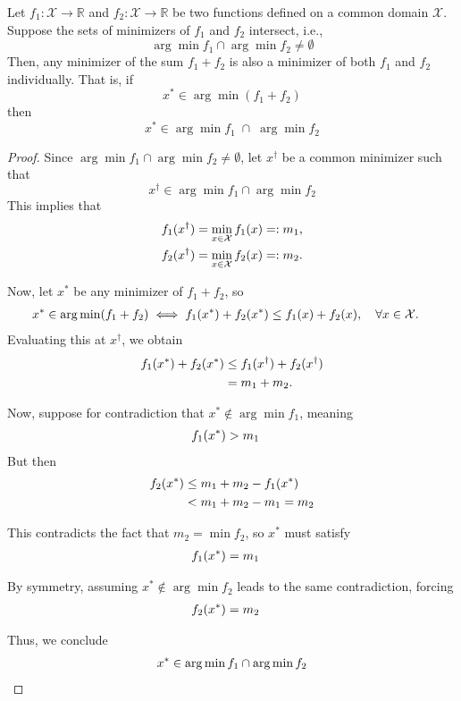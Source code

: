 \begin{lem}\label{lem:sharingsol}
    Let $f_1: \mathcal{X} \rightarrow \mathbb{R}$ and $f_2: \mathcal{X} \rightarrow \mathbb{R}$ be two functions defined on a common domain $\mathcal{X}$. Suppose the sets of minimizers of $f_1$ and $f_2$ intersect, i.e.,
$$
\arg \min f_1 \cap \arg \min f_2 \neq \emptyset
$$
Then, any minimizer of the sum $f_1+f_2$ is also a minimizer of both $f_1$ and $f_2$ individually. That is, if
$$
x^* \in \arg \min \left(f_1+f_2\right)
$$
then
$$
x^* \in \arg \min f_1 \; \cap \; \arg \min f_2
$$
\end{lem}
\begin{proof}
    Since \( \arg\min f_1 \cap \arg\min f_2 \neq \emptyset \), let \( x^\dagger \) be a common minimizer such that $$
x^\dagger \in \arg\min f_1 \cap \arg\min f_2$$
This implies that  
\begin{align}
    f_1(x^\dagger) &= \min_{x \in \mathcal{X}} f_1(x) =: m_1, \notag
    \\
    f_2(x^\dagger) &= \min_{x \in \mathcal{X}} f_2(x) =: m_2. \notag
\end{align}

Now, let \( x^* \) be any minimizer of \( f_1 + f_2 \), so  
\begin{align}
    x^* \in \arg\min (f_1 + f_2) &\iff f_1(x^*) + f_2(x^*) \leq f_1(x) + f_2(x), \quad \forall x \in \mathcal{X}. \notag
\end{align}
Evaluating this at \( x^\dagger \), we obtain  
\begin{align}
    f_1(x^*) + f_2(x^*) &\leq f_1(x^\dagger) + f_2(x^\dagger) \notag
    \\
    &= m_1 + m_2. \notag
\end{align}

Now, suppose for contradiction that $x^* \notin \arg\min f_1$, 
meaning  
\begin{align}
    f_1(x^*) &> m_1 \notag
\end{align}
But then
\begin{align}
    f_2(x^*) & \le m_1 + m_2 - f_1(x^*) \notag
    \\
    &< m_1 + m_2 - m_1 = m_2 \notag
\end{align}

This contradicts the fact that \( m_2 = \min f_2 \), so \( x^* \) must satisfy  
\begin{align}
    f_1(x^*) &= m_1 \notag
\end{align}

By symmetry, assuming $x^* \notin \arg\min f_2$ leads to the same contradiction, forcing  
\begin{align}
    f_2(x^*) &= m_2 \notag
\end{align}

Thus, we conclude  
\begin{align}
    x^* \in \arg\min f_1 \cap \arg\min f_2 \notag
\end{align}
\end{proof}

